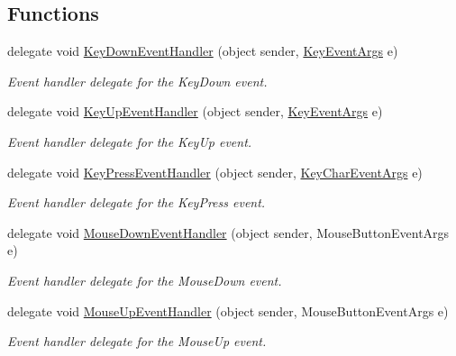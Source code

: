 \subsection*{Functions}
\begin{DoxyCompactItemize}
\item 
delegate void \hyperlink{namespace_tri_devs_1_1_tri_engine_1_1_input_1_1_events_a1f91447b08872fce05923dc550815310}{Key\-Down\-Event\-Handler} (object sender, \hyperlink{class_tri_devs_1_1_tri_engine_1_1_input_1_1_events_1_1_key_event_args}{Key\-Event\-Args} e)
\begin{DoxyCompactList}\small\item\em Event handler delegate for the Key\-Down event. \end{DoxyCompactList}\item 
delegate void \hyperlink{namespace_tri_devs_1_1_tri_engine_1_1_input_1_1_events_ac2e0989d60050327019ccfeed4fcbf59}{Key\-Up\-Event\-Handler} (object sender, \hyperlink{class_tri_devs_1_1_tri_engine_1_1_input_1_1_events_1_1_key_event_args}{Key\-Event\-Args} e)
\begin{DoxyCompactList}\small\item\em Event handler delegate for the Key\-Up event. \end{DoxyCompactList}\item 
delegate void \hyperlink{namespace_tri_devs_1_1_tri_engine_1_1_input_1_1_events_a4ea57046f815e9609520e175ac1fc801}{Key\-Press\-Event\-Handler} (object sender, \hyperlink{class_tri_devs_1_1_tri_engine_1_1_input_1_1_events_1_1_key_char_event_args}{Key\-Char\-Event\-Args} e)
\begin{DoxyCompactList}\small\item\em Event handler delegate for the Key\-Press event. \end{DoxyCompactList}\item 
delegate void \hyperlink{namespace_tri_devs_1_1_tri_engine_1_1_input_1_1_events_a06c49e7e2187f171fd8c6f7c3a4e6390}{Mouse\-Down\-Event\-Handler} (object sender, Mouse\-Button\-Event\-Args e)
\begin{DoxyCompactList}\small\item\em Event handler delegate for the Mouse\-Down event. \end{DoxyCompactList}\item 
delegate void \hyperlink{namespace_tri_devs_1_1_tri_engine_1_1_input_1_1_events_a3775a4588d9c37e243a05f6c53f1f97c}{Mouse\-Up\-Event\-Handler} (object sender, Mouse\-Button\-Event\-Args e)
\begin{DoxyCompactList}\small\item\em Event handler delegate for the Mouse\-Up event. \end{DoxyCompactList}\item 

\end{DoxyCompactItemize}
